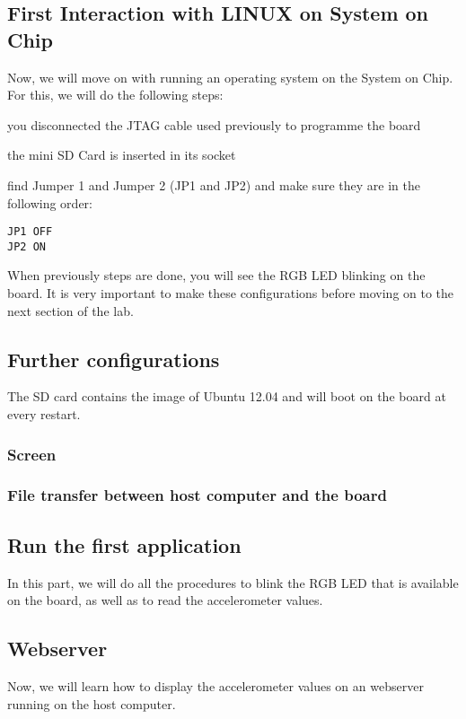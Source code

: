 \subsection{First Interaction with LINUX on System on Chip}

Now, we will move on with running an operating system on the System on Chip. For this, we will do the following steps:
\begin{myitemize}
\item you disconnected the JTAG cable used previously to programme the board
\item the mini SD Card is inserted in its socket
\item find Jumper 1 and Jumper 2 (JP1 and JP2) and make sure they are in the following order:
\begin{verbatim}
JP1 OFF 
JP2 ON
\end{verbatim}
\end{myitemize}


When previously steps are done, you will see the RGB LED blinking on the board. It is very
important to make these configurations before moving on to the next section of the lab.

\subsection{Further configurations}

The SD card contains the image of Ubuntu 12.04 and will boot on the board at every 
restart.

\subsubsection{Screen}

\subsubsection{File transfer between host computer and the board}




\subsection{Run the first application}

In this part, we will do all the procedures to blink the RGB LED that is available 
on the board, as well as to read the accelerometer values.

\subsection{Webserver}
Now, we will learn how to display the accelerometer values on an webserver running
on the host computer.

